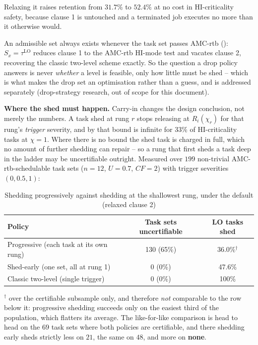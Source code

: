 \documentclass{article}
\begin{document}
\noindent Relaxing it raises retention from $31.7\%$ to $52.4\%$ at no cost in
HI-criticality safety, because clause 1 is untouched and a terminated job
executes no more than it otherwise would.

An admissible set always exists
whenever the task set passes AMC-rtb (): $S_x = \tau^{\mathrm{LO}}$
reduces clause 1 to the AMC-rtb HI-mode test and vacates clause 2, recovering
the classic two-level scheme exactly. So the question a drop policy answers is
never \emph{whether} a level is feasible, only how little must be shed --
which is what makes the drop set an optimisation rather than a guess, and is
addressed separately (drop-strategy research, out of scope for this document).

\textbf{Where the shed must happen.} Carry-in changes the design conclusion,
not merely the numbers. A task shed at rung $r$ stops releasing at
$R_i(\chi_r)$ for that rung's \emph{trigger} severity, and by
 that bound is infinite for $33\%$ of HI-criticality tasks
at $\chi = 1$. Where there is no bound the shed task is charged in full, which
no amount of further shedding can repair -- so a rung that first sheds a task
deep in the ladder may be uncertifiable outright. Measured over $199$
non-trivial AMC-rtb-schedulable task sets ($n = 12$, $U = 0.7$, $CF = 2$) with
trigger severities $(0, 0.5, 1)$:

\begin{table}[h]
\centering
\caption{Shedding progressively against shedding at the shallowest rung,
under the default (relaxed clause 2)}
\label{tab:shed-early}
\begin{tabular}{lcc}
\toprule
Policy & Task sets uncertifiable & LO tasks shed \\
\midrule
Progressive (each task at its own rung) & 130 (65\%) & 36.0\%$^{\dagger}$ \\
Shed-early (one set, all at rung 1)     & \phantom{13}0 \phantom{9}(0\%) & 47.6\% \\
\midrule
Classic two-level (single trigger)      & \phantom{13}0 \phantom{9}(0\%) & 100\% \\
\bottomrule
\end{tabular}
\end{table}

\noindent $^{\dagger}$ over the certifiable subsample only, and therefore
\emph{not} comparable to the row below it: progressive shedding succeeds only
on the easiest third of the population, which flatters its average. The
like-for-like comparison is head to head on the $69$ task sets where both
policies are certifiable, and there shedding early sheds strictly less on
$21$, the same on $48$, and more on \textbf{none}.
\end{document}
